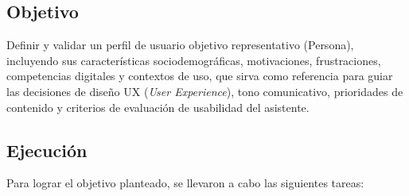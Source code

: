 \subsection{Objetivo}
Definir y validar un perfil de usuario objetivo representativo (Persona),
incluyendo sus características sociodemográficas, motivaciones, frustraciones,
competencias digitales y contextos de uso, que sirva como referencia para guiar
las decisiones de diseño UX (\textit{User Experience}), tono comunicativo,
prioridades de contenido y criterios de evaluación de usabilidad del asistente.

\subsection{Ejecución}
Para lograr el objetivo planteado, se llevaron a cabo las siguientes tareas:

